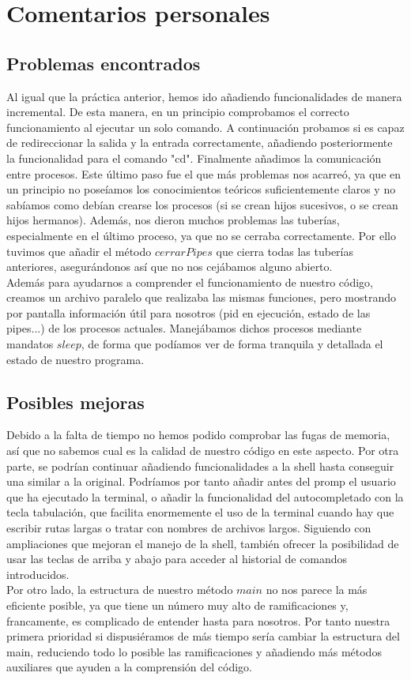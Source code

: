 \chapter{Comentarios personales}
\section{Problemas encontrados}
Al igual que la práctica anterior, hemos ido añadiendo funcionalidades de manera incremental. De esta manera, en un principio comprobamos el correcto funcionamiento al ejecutar un solo comando. A continuación probamos si es capaz de redireccionar la salida y la entrada correctamente, añadiendo posteriormente la funcionalidad para el comando "cd". Finalmente añadimos la comunicación entre procesos. Este último paso fue el que más problemas nos acarreó, ya que en un principio no poseíamos los conocimientos teóricos suficientemente claros y no sabíamos como debían crearse los procesos (si se crean hijos sucesivos, o se crean hijos hermanos). Además, nos dieron muchos problemas las tuberías, especialmente en el último proceso, ya que no se cerraba correctamente. Por ello tuvimos que añadir el método $cerrarPipes$ que cierra todas las tuberías anteriores, asegurándonos así que no nos cejábamos alguno abierto.\\
Además para ayudarnos a comprender el funcionamiento de nuestro código, creamos un archivo paralelo que realizaba las mismas funciones, pero mostrando por pantalla información útil para nosotros (pid en ejecución, estado de las pipes...) de los procesos actuales. Manejábamos dichos procesos mediante mandatos $sleep$, de forma que podíamos ver de forma tranquila y detallada el estado de nuestro programa.
\section{Posibles mejoras}
Debido a la falta de tiempo no hemos podido comprobar las fugas de memoria, así que no sabemos cual es la calidad de nuestro código en este aspecto. Por otra parte, se podrían continuar añadiendo funcionalidades a la shell hasta conseguir una similar a la original. Podríamos por tanto añadir antes del promp el usuario que ha ejecutado la terminal, o añadir la funcionalidad del autocompletado con la tecla tabulación, que facilita enormemente el uso de la terminal cuando hay que escribir rutas largas o tratar con nombres de archivos largos. Siguiendo con ampliaciones que mejoran el manejo de la shell, también ofrecer la posibilidad de usar las teclas de arriba y abajo para acceder al historial de comandos introducidos.\\
Por otro lado, la estructura de nuestro método $main$ no nos parece la más eficiente posible, ya que tiene un número muy alto de ramificaciones y, francamente, es complicado de entender hasta para nosotros. Por tanto nuestra primera prioridad si dispusiéramos de más tiempo sería cambiar la estructura del main, reduciendo todo lo posible las ramificaciones y añadiendo más métodos auxiliares que ayuden a la comprensión del código. 
\newpage
